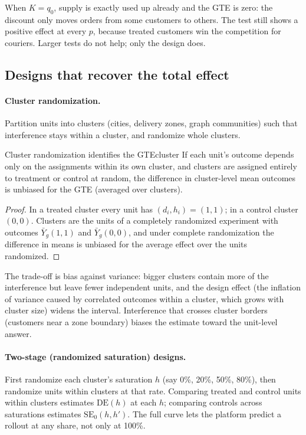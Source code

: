 \documentclass[11pt]{article}
\begin{document}
When $K = q_0$, supply is exactly used up already and the GTE is zero: the discount only moves orders from some
customers to others. The test still shows a positive effect at every $p$, because treated customers win the
competition for couriers. Larger tests do not help; only the design does.

\subsection{Designs that recover the total effect}

\paragraph{Cluster randomization.} Partition units into clusters (cities, delivery zones, graph communities) such
that interference stays within a cluster, and randomize whole clusters.

\begin{prop}{Cluster randomization identifies the GTE}{cluster}
If each unit's outcome depends only on the assignments within its own cluster, and clusters are assigned entirely to
treatment or control at random, the difference in cluster-level mean outcomes is unbiased for the GTE (averaged over
clusters).
\end{prop}
\begin{proof}
In a treated cluster every unit has $(d_i, h_i) = (1,1)$; in a control cluster $(0,0)$. Clusters are the units of a
completely randomized experiment with outcomes $\bar Y_g(1,1)$ and $\bar Y_g(0,0)$, and under complete randomization
the difference in means is unbiased for the average effect over the units randomized.
\end{proof}

The trade-off is bias against variance: bigger clusters contain more of the interference but leave fewer
independent units, and the design effect (the inflation of variance caused by correlated outcomes within a
cluster, which grows with cluster size) widens the interval. Interference that crosses cluster
borders (customers near a zone boundary) biases the estimate toward the unit-level answer.

\paragraph{Two-stage (randomized saturation) designs.} First randomize each cluster's saturation $h$ (say 0\%, 20\%,
50\%, 80\%), then randomize units within clusters at that rate. Comparing treated and control units within clusters
estimates $\text{DE}(h)$ at each $h$; comparing controls across saturations estimates $\text{SE}_0(h, h')$. The full curve
lets the platform predict a rollout at any share, not only at 100\%.
\end{document}
